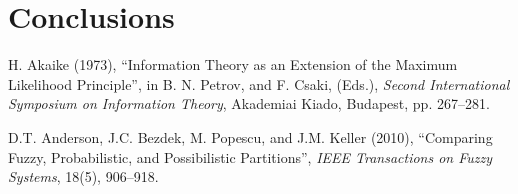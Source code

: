 \documentclass[12pt,reqno, twoside]{amsbook}
\theoremstyle{plain}
\numberwithin{equation}{chapter}
\numberwithin{section}{chapter}
\begin{document}
\chapter{Conclusions}

\renewcommand{\bibname}{References}


\def\bibindent{0.7cm}
\begin{thebibliography}{99\kern\bibindent}
\makeatletter
\let\old@biblabel\@biblabel
\def\@biblabel#1{\old@biblabel{#1}\kern\bibindent}
\let\old@bibitem\bibitem
\def\bibitem#1{\old@bibitem{#1}\leavevmode\kern-\bibindent}
\makeatother
\makeatletter
\renewcommand\@biblabel[1]{}
\makeatother

 H. Akaike (1973), \textquotedblleft Information Theory as an
Extension of the Maximum Likelihood Principle\textquotedblright, in B. N.
Petrov, and F. Csaki, (Eds.), \textit{Second International Symposium on
Information Theory}, Akademiai Kiado, Budapest, pp. 267--281.

 D.T. Anderson, J.C. Bezdek, M. Popescu, and J.M. Keller
(2010), \textquotedblleft Comparing Fuzzy, Probabilistic, and Possibilistic
Partitions\textquotedblright, \textit{IEEE Transactions on Fuzzy Systems},
18(5), 906--918.
\end{thebibliography}
\end{document}
